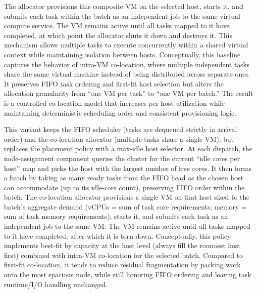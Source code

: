 The allocator provisions this composite VM on the selected host, starts it, and submits each task within the batch as an independent job to the same virtual compute service. The VM remains active until all tasks mapped to it have completed, at which point the allocator shuts it down and destroys it. This mechanism allows multiple tasks to execute concurrently within a shared virtual context while maintaining isolation between hosts.
Conceptually, this baseline captures the behavior of intra-VM co-location, where multiple independent tasks share the same virtual machine instead of being distributed across separate ones. It preserves FIFO task ordering and first-fit host selection but alters the allocation granularity from “one VM per task” to “one VM per batch.” The result is a controlled co-location model that increases per-host utilization while maintaining deterministic scheduling order and consistent provisioning logic.

This variant keeps the FIFO scheduler (tasks are dequeued strictly in arrival order) and the co-location allocator (multiple tasks share a single VM), but replaces the placement policy with a max-idle host selector. At each dispatch, the node-assignment component queries the cluster for the current “idle cores per host” map and picks the host with the largest number of free cores. It then forms a batch by taking as many ready tasks from the FIFO head as the chosen host can accommodate (up to its idle-core count), preserving FIFO order within the batch.
The co-location allocator provisions a single VM on that host sized to the batch’s aggregate demand (vCPUs = sum of task core requirements; memory = sum of task memory requirements), starts it, and submits each task as an independent job to the same VM. The VM remains active until all tasks mapped to it have completed, after which it is torn down. Conceptually, this policy implements best-fit by capacity at the host level (always fill the roomiest host first) combined with intra-VM co-location for the selected batch. Compared to first-fit co-location, it tends to reduce residual fragmentation by packing work onto the most spacious node, while still honoring FIFO ordering and leaving task runtime/I/O handling unchanged.

